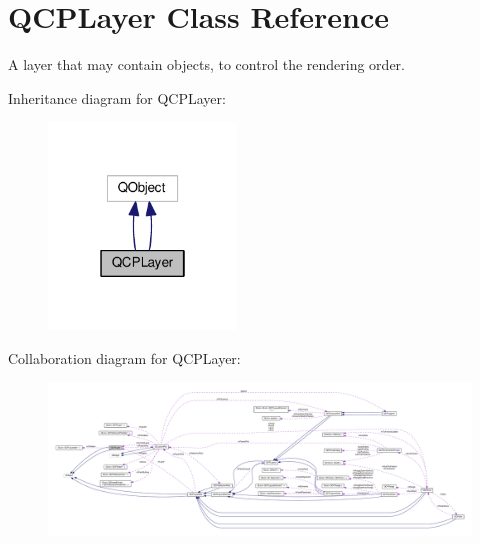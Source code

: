 \hypertarget{class_q_c_p_layer}{}\section{Q\+C\+P\+Layer Class Reference}
\label{class_q_c_p_layer}


A layer that may contain objects, to control the rendering order.  




Inheritance diagram for Q\+C\+P\+Layer\+:\nopagebreak
\begin{figure}[H]
\begin{center}
\leavevmode
\includegraphics[width=142pt]{class_q_c_p_layer__inherit__graph}
\end{center}
\end{figure}


Collaboration diagram for Q\+C\+P\+Layer\+:\nopagebreak
\begin{figure}[H]
\begin{center}
\leavevmode
\includegraphics[width=350pt]{class_q_c_p_layer__coll__graph}
\end{center}
\end{figure}
